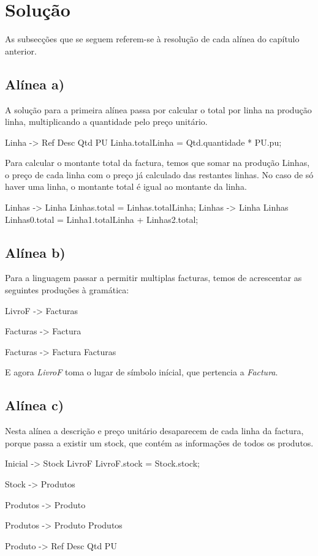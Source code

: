 \documentclass[11pt,a4paper]{article}
\begin{document}
\section{Solução}
As subsecções que se seguem referem-se à resolução de cada alínea do capítulo anterior.
\subsection{Alínea a)}
A solução para a primeira alínea passa por calcular o total por linha na produção linha, multiplicando a quantidade pelo preço unitário.

\begin{code_txt} 
Linha -> Ref Desc Qtd PU {Linha.totalLinha = Qtd.quantidade * PU.pu;}
\end{code_txt}

Para calcular o montante total da factura, temos que somar na produção Linhas, o preço de cada linha com o preço já calculado das restantes linhas.
No caso de só haver uma linha, o montante total é igual ao montante da linha.

\begin{code_txt} 
Linhas -> Linha {Linhas.total = Linhas.totalLinha;}
Linhas -> Linha Linhas {Linhas0.total = Linha1.totalLinha + Linhas2.total;}
\end{code_txt}

\subsection{Alínea b)}
Para a linguagem passar a permitir multiplas facturas, temos de acrescentar as seguintes produções à gramática:

\begin{code_txt} 
LivroF -> Facturas

Facturas -> Factura

Facturas -> Factura Facturas
\end{code_txt}
 
E agora \textit{LivroF} toma o lugar de símbolo inícial, que pertencia a \textit{Factura}.
 
\subsection{Alínea c)}
Nesta alínea a descrição e preço unitário desaparecem de cada linha da factura, porque passa a existir um stock, que contém as informações de todos os produtos.

\begin{code_txt} 
Inicial -> Stock LivroF { LivroF.stock = Stock.stock; }

Stock -> Produtos

Produtos -> Produto

Produtos -> Produto Produtos

Produto -> Ref Desc Qtd PU
\end{code_txt}
\end{document}
